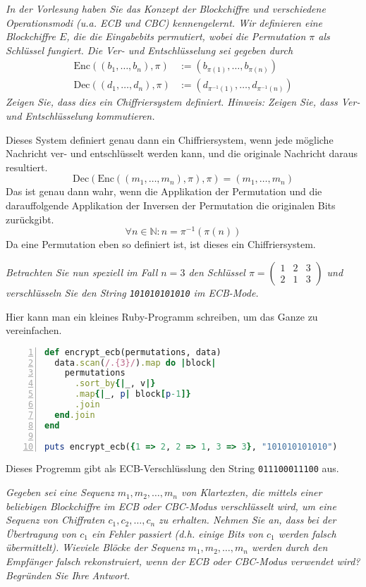 \documentclass[
  ngerman,
  DIV=12
]{scrartcl}
\begin{document}
\emph{In der Vorlesung haben Sie das Konzept der Blockchiffre und verschiedene Operationsmodi (u.a. ECB und CBC) kennengelernt. Wir definieren eine Blockchiffre $E$, die die Eingabebits permutiert, wobei die Permutation $\pi$ als Schlüssel fungiert. Die Ver- und Entschlüsselung sei gegeben durch}
\begin{align*}
\mathrm{Enc}((b_1,\dots,b_n),\pi) &:= (b_{\pi(1)},\dots,b_{\pi(n)})\\
\mathrm{Dec}((d_1,\dots,d_n),\pi) &:= (d_{\pi^{-1}(1)},\dots,d_{\pi^{-1}(n)})  
\end{align*}
\emph{Zeigen Sie, dass dies ein Chiffriersystem definiert. Hinweis: Zeigen Sie, dass Ver- und Entschlüsselung kommutieren.}

\medskip\noindent
Dieses System definiert genau dann ein Chiffriersystem, wenn jede mögliche Nachricht ver- und entschlüsselt werden kann, und die originale Nachricht daraus resultiert.
\begin{equation*}
\mathrm{Dec}(\mathrm{Enc}((m_1, \dots, m_n), \pi), \pi) = (m_1, \dots, m_n)
\end{equation*}
Das ist genau dann wahr, wenn die Applikation der Permutation und die darauffolgende Applikation der Inversen der Permutation die originalen Bits zurückgibt. 
\begin{equation*}
\forall n \in \mathbb{N} : n = \pi^{-1}(\pi(n))  
\end{equation*}
Da eine Permutation eben so definiert ist, ist dieses ein Chiffriersystem.

\bigskip\noindent
\emph{Betrachten Sie nun speziell im Fall $n = 3$ den Schlüssel $\pi = \begin{pmatrix}1&2&3\\2&1&3\end{pmatrix}$ und verschlüsseln Sie den String \texttt{101010101010} im ECB-Mode.}

\medskip\noindent
Hier kann man ein kleines Ruby-Programm schreiben, um das Ganze zu vereinfachen.
\begin{lstlisting}[language=ruby,numbers=left]
def encrypt_ecb(permutations, data)
  data.scan(/.{3}/).map do |block|
    permutations
      .sort_by{|_, v|}
      .map{|_, p| block[p-1]}
      .join
  end.join
end

puts encrypt_ecb({1 => 2, 2 => 1, 3 => 3}, "101010101010")
\end{lstlisting}
Dieses Progremm gibt als ECB-Verschlüsslung den String \verb|011100011100| aus.

\bigskip\noindent
\emph{Gegeben sei eine Sequenz $m_1, m_2, \dots, m_n$ von Klartexten, die mittels einer beliebigen Blockchiffre im ECB oder CBC-Modus verschlüsselt wird, um eine Sequenz von Chiffraten $c_1, c_2, \dots, c_n$ zu erhalten. Nehmen Sie an, dass bei der Übertragung von $c_1$ ein Fehler passiert (d.h. einige Bits von $c_1$ werden falsch übermittelt). Wieviele Blöcke der Sequenz $m_1, m_2, \dots , m_n$ werden durch den Empfänger falsch rekonstruiert, wenn der ECB oder CBC-Modus verwendet wird? Begründen Sie Ihre Antwort.}
\end{document}
